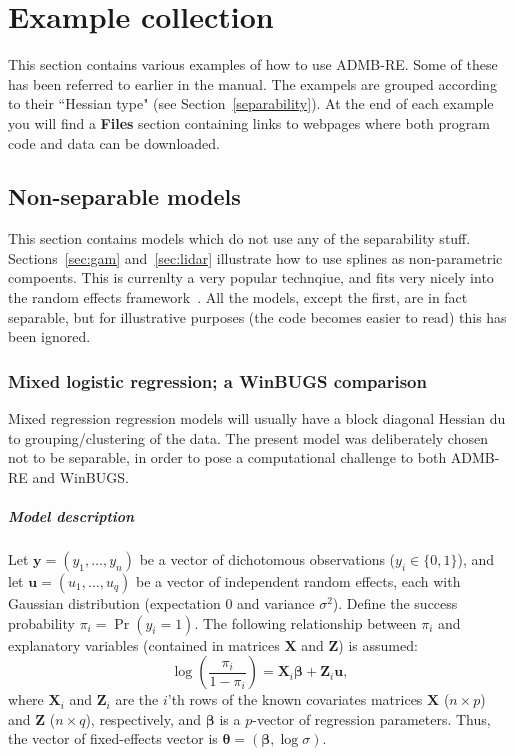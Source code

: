 \documentclass[12pt,letter,reqno]{book}
\begin{document}
\chapter{Example collection}
\label{sec:example_collection}
This section contains various examples of how to use ADMB-RE. Some of
these has been referred to earlier in the manual. The exampels are grouped according
to their ``Hessian type" (see Section~\ref{separability}). At the end of each example
you will find a {\bf Files} section containing links to webpages where both program code
and data can be downloaded.

\section{Non-separable models}
This section contains models which do not use any of the separability stuff.
Sections~\ref{sec:gam} and~\ref{sec:lidar}
illustrate how to use splines as non-parametric compoents. This is currenlty
a very popular technqiue, and fits very nicely
into the random effects framework~\cite{rupp:wand:carr:2003}. 
All the models, except the first, are in fact separable, but for illustrative purposes (the code becomes easier to read)
this has been ignored.

\newpage

\subsection{Mixed logistic regression; a WinBUGS comparison}
\label{sec:logistic_example}
Mixed regression regression models will usually have a block diagonal Hessian
du to grouping/clustering of the data. The present model was deliberately
chosen not to be separable, in order to pose a computational challenge
to both ADMB-RE and WinBUGS. 

\paragraph{Model description}
Let $\mathbf{y}=(y_1,\ldots,y_n)$ be a vector of dichotomous observations
($y_i\in\{0,1\}$), and let $\mathbf{u}=(u_1,\ldots,u_q)$ be a vector of
independent random effects, each with Gaussian distribution (expectation $0$ and
variance $\sigma^2$). Define the success probability $\pi_i=\Pr(y_i=1)$. The
following relationship between $\pi_i$ and explanatory variables (contained in
matrices $\mathbf{X}$ and $\mathbf{Z}$) is assumed:
\[
  \log\left(\frac{\pi_i}{1-\pi_i}\right) = \mathbf{X}_i\mathbf{\beta} +
  \mathbf{Z}_i\mathbf{u},
\]
where $\mathbf{X}_i$ and $\mathbf{Z}_i$ are the $i$'th rows of the known
covariates matrices $\mathbf{X}$ ($n\times p$) and $\mathbf{Z}$ ($n\times q$),
respectively, and $\mathbf{\beta}$ is a $p$-vector of regression parameters.
Thus, the vector of fixed-effects vector is
$\mathbf{\theta}=(\mathbf{\beta},\log\sigma)$.
\end{document}
